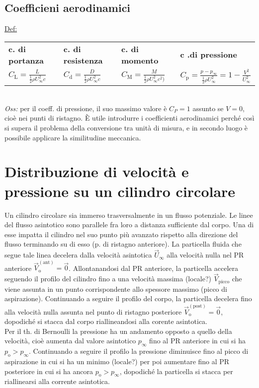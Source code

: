 \documentclass[11pt,a4paper]{report}
\newcommand{\de}{\mathrm d}
\begin{document}
		\subsection{Coefficieni aerodinamici}	\label{coeff aero}
		\underline{Def:}\begin{tabular}{llll}
			\textbf{c. di portanza}&\textbf{c. di resistenza}&\textbf{c. di momento}&\textbf{c .di pressione}\\
			$C_\mathrm L=\frac{L}{\frac 12\rho U_\infty^2c}$&$C_\de =\frac{D}{\frac 12\rho U_\infty^2c}$&$C_\mathrm M=\frac{M}{\frac 12\rho U_\infty^2c^2)}$&$C_\mathrm p=\frac{p-p_\infty}{\frac 12\rho U_\infty^2}=1-\frac{V^2}{U_\infty^2}$
		\end{tabular}\\
		\textit{Oss:} per il coeff. di pressione, il suo massimo valore è $C_P=1$ assunto se $V=0$, cioè nei punti di ristagno. È utile introdurre i coefficienti aerodinamici perché così si supera il problema della conversione tra unità di misura, e in secondo luogo è possibile applicare la similitudine meccanica.
			
    \section{Distribuzione di velocità e pressione su un cilindro circolare}
    Un cilindro circolare sia immerso trasversalmente in un flusso potenziale. Le linee del flusso asintotico sono parallele fra loro a distanza sufficiente dal corpo. Una di esse impatta il cilindro nel suo punto più avanzato rispetto alla direzione del flusso terminando su di esso (p. di ristagno anteriore). La particella fluida che segue tale linea decelera dalla velocità asintotica $\vec U_\infty$ alla velocità nulla nel PR anteriore $\vec V_\mathrm o^{(\mathrm{ant})}=\vec 0$. Allontanandosi dal PR anteriore, la particella accelera seguendo il profilo del cilindro fino a una velocità massima (locale?) $\vec V_\mathrm{picco}$ che viene assunta in un punto corrispondente allo spessore massimo (picco di aspirazione). Continuando a seguire il profilo del corpo, la particella decelera fino alla velocità nulla assunta nel punto di ristagno posteriore $\vec V_\mathrm o^{(\mathrm{post})}=\vec 0$, dopodiché si stacca dal corpo riallineandosi alla corente asintotica.\\
    Per il th. di Bernoulli la pressione ha un andamento opposto a quello della velocità, cioè aumenta dal valore asintotico $p_\infty$ fino al PR anteriore in cui si ha $p_\mathrm o>p_\infty$. Continuando a seguire il profilo la pressione diminuisce fino al picco di aspirazione in cui si ha un minimo (locale?) per poi aumentare fino al PR posteriore in cui si ha ancora $p_\mathrm o>p_\infty$, dopodiché la particella si stacca per riallinearsi alla corrente asintotica.
\end{document}
